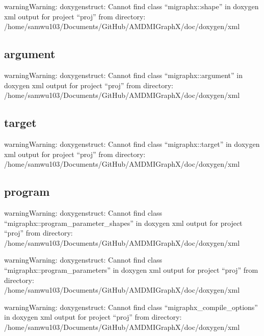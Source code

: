 \documentclass[letterpaper,10pt,english]{sphinxmanual}
\begin{document}
\begin{sphinxadmonition}{warning}{Warning:}
\sphinxAtStartPar
doxygenstruct: Cannot find class “migraphx::shape” in doxygen xml output for project “proj” from directory: /home/samwu103/Documents/GitHub/AMDMIGraphX/doc/doxygen/xml
\end{sphinxadmonition}


\subsection{argument}
\label{\detokenize{reference/cpp:argument}}
\begin{sphinxadmonition}{warning}{Warning:}
\sphinxAtStartPar
doxygenstruct: Cannot find class “migraphx::argument” in doxygen xml output for project “proj” from directory: /home/samwu103/Documents/GitHub/AMDMIGraphX/doc/doxygen/xml
\end{sphinxadmonition}


\subsection{target}
\label{\detokenize{reference/cpp:target}}
\begin{sphinxadmonition}{warning}{Warning:}
\sphinxAtStartPar
doxygenstruct: Cannot find class “migraphx::target” in doxygen xml output for project “proj” from directory: /home/samwu103/Documents/GitHub/AMDMIGraphX/doc/doxygen/xml
\end{sphinxadmonition}


\subsection{program}
\label{\detokenize{reference/cpp:program}}
\begin{sphinxadmonition}{warning}{Warning:}
\sphinxAtStartPar
doxygenstruct: Cannot find class “migraphx::program\_parameter\_shapes” in doxygen xml output for project “proj” from directory: /home/samwu103/Documents/GitHub/AMDMIGraphX/doc/doxygen/xml
\end{sphinxadmonition}

\begin{sphinxadmonition}{warning}{Warning:}
\sphinxAtStartPar
doxygenstruct: Cannot find class “migraphx::program\_parameters” in doxygen xml output for project “proj” from directory: /home/samwu103/Documents/GitHub/AMDMIGraphX/doc/doxygen/xml
\end{sphinxadmonition}

\begin{sphinxadmonition}{warning}{Warning:}
\sphinxAtStartPar
doxygenstruct: Cannot find class “migraphx\_compile\_options” in doxygen xml output for project “proj” from directory: /home/samwu103/Documents/GitHub/AMDMIGraphX/doc/doxygen/xml
\end{sphinxadmonition}
\end{document}
